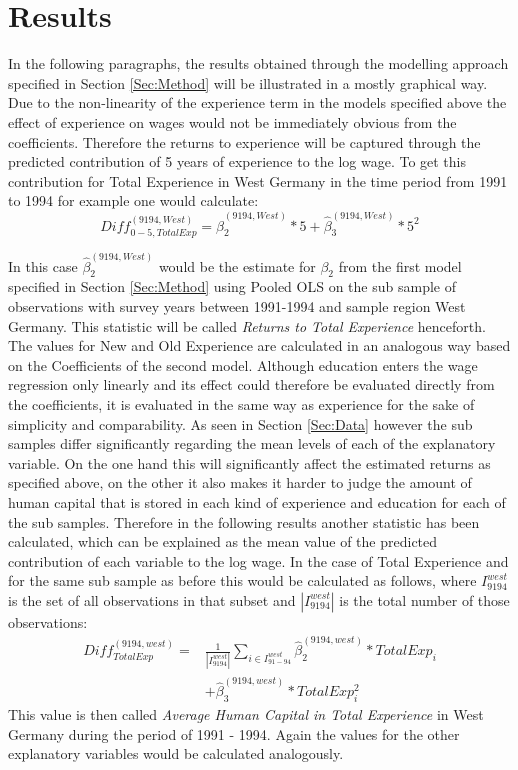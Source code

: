 \section{Results} \label{Sec:Results}
In the following paragraphs, the results obtained through the modelling approach specified in Section \ref{Sec:Method} will be illustrated in a mostly graphical way.
Due to the non-linearity of the experience term in the models specified above the effect of experience on wages would not be immediately obvious from the coefficients. Therefore the returns to experience will be captured through the predicted contribution of 5 years of experience to the log wage. To get this contribution for Total Experience in West Germany in the time period from 1991 to 1994 for example one would calculate: 
	\begin{equation} 
	Diff_{0-5,TotalExp}^{(9194, West)} = \hat{\beta}_{2}^{(9194, West)}*5 + \hat{\beta}_{3}^{(9194, West)} * 5^2
	\end{equation}

In this case $\hat{\beta}_{2}^{(9194, West)}$ would be the estimate for $
\beta_{2}$ from the first model specified in Section \ref{Sec:Method} using Pooled OLS on the sub sample of observations with survey years between 1991-1994 and sample region West Germany. This statistic  will be called \textit{Returns to Total Experience} henceforth. The values for New and Old Experience are calculated in an analogous way based on the Coefficients of the second model. Although education enters the wage regression only linearly and its effect could therefore be evaluated directly from the coefficients, it is evaluated in the same way as experience for the sake of simplicity and comparability. 
As seen in Section \ref{Sec:Data} however the sub samples differ significantly regarding the mean levels of each of the explanatory variable. On the one hand this will significantly affect the estimated returns as specified above, on the other it also makes it harder to judge the amount of human capital that is stored in each kind of experience and education for each of the sub samples. Therefore in the following results another statistic has been calculated, which can be explained as the mean value of the predicted contribution of each variable to the log wage. In the case of Total Experience and for the same sub sample as before this would be calculated as follows, where $I_{9194}^{west}$ is the set of all observations in that subset and $|I_{9194}^{west}|$ is the total number of those observations:
	\begin{equation} 
	\begin{split}
	Diff_{TotalExp}^{(9194, west)} =& \frac{1}{|I_{9194}^{west}|}\sum_{i \in 	I_{91-94}^{west}} \hat{\beta}_{2}^{(9194, west)}*TotalExp_{i}\\
 	&+\hat{\beta}_{3}^{(9194, west)} * TotalExp_{i}^2
	\end{split}
	\end{equation}
This value is then called \textit{Average Human Capital in Total Experience} in West Germany during the period of 1991 - 1994. Again the values for the other explanatory variables would be calculated analogously. 
